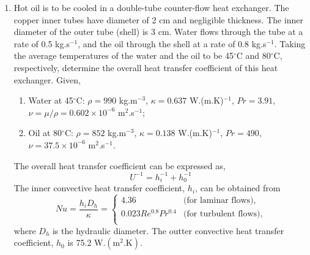 \documentclass[calculator,datasheet,handbook,solutions]{exam}
\begin{document}
\begin{question}
\begin{enumerate}[1.]
  \end{enumerate}
  
\end{question}

\pagebreak
\begin{question}
  \begin{enumerate}
      \item  Hot oil is to be cooled in a double-tube counter-flow heat exchanger. The copper inner tubes have diameter of 2 cm and negligible thickness. The inner diameter of the outer tube (shell) is 3 cm. Water flows through the tube at a rate of 0.5 kg.s$^{-1}$, and the oil through the shell at a rate of 0.8 kg.s$^{-1}$. Taking the average temperatures of the water and the oil to be 45$^{\circ}$C and 80$^{\circ}$C, respectively, determine the overall heat transfer coefficient of this heat exchanger. Given, 
         \begin{enumerate} 
             \item Water at 45$^{\circ}$C: $\rho=990$ kg.m$^{-3}$, $\kappa=0.637$ W.(m.K)$^{-1}$, $Pr=3.91$, $\nu=\mu/\rho=0.602\times 10^{-6}$ m$^{2}$.s$^{-1}$; 
             \item Oil at 80$^{\circ}$C: $\rho=852$ kg.m$^{-3}$, $\kappa=0.138$ W.(m.K)$^{-1}$, $Pr=490$, $\nu=37.5\times 10^{-6}$ m$^{2}$.s$^{-1}$.
         \end{enumerate}
         The overall heat transfer coefficient can be expressed as,
           \begin{displaymath}
             U^{-1} = h_{i}^{-1} + h_{0}^{-1}
           \end{displaymath}
         The inner convective heat transfer coefficient, $h_{i}$, can be obtained from
         \begin{displaymath}
                Nu = \frac{h_{i}D_{h}}{\kappa} =
                     \begin{cases}
                         4.36  & \text{(for laminar flows),} \\
                         0.023 Re^{0.8} Pr^{0.4} & \text{(for turbulent flows),} \\
                     \end{cases}
         \end{displaymath}
         where $D_{h}$ is the hydraulic diameter. The outter convective heat transfer coefficient, $h_{0}$ is 75.2 W.$\left(\text{m}^{2}.\text{K}\right)$.
\end{enumerate}
\end{question}
\end{document}
